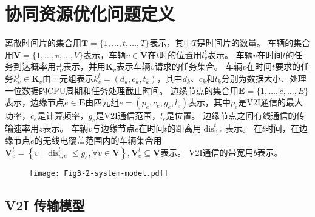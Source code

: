 \section{协同资源优化问题定义}\label{section 3-3}

离散时间片的集合用$\mathbf{T}=\{1, \ldots, t, \ldots, T\}$表示，其中$T$是时间片的数量。
车辆的集合用$\mathbf{V}=\{1, \ldots, v, \ldots, V\}$表示，车辆$v \in \mathbf{V}$在$t$时的位置用$l_{v}^{t}$表示。
车辆$v$在时间$t$的任务到达概率用$\tau_{v}^{t}$表示，并用$\mathbf{K}_{v}$表示车辆$v$请求的任务集合。
车辆$v$在时间$t$要求的任务$k_{v}^{t} \in \mathbf{K}_{v}$由三元组表示$k_{v}^{t}=\left(d_{k}, c_{k}, t_{k}\right)$，其中$d_{k}$、$c_{k}$和$t_{k}$分别为数据大小、处理一位数据的CPU周期和任务处理截止时间。
边缘节点的集合用$\mathbf{E}=\{1, \ldots, e, \ldots, E\}$表示，边缘节点$e \in \mathbf{E}$由四元组$e=\left(p_{e}, c_{e}, g_{e}, l_{e}\right)$表示，其中$p_{e}$是V2I通信的最大功率，$c_{e}$是计算频率，$g_e$是V2I通信范围，$l_{e}$是位置。
边缘节点之间有线通信的传输速率用$z$表示。
车辆$v$与边缘节点$e$在时间$t$的距离用$\operatorname{dis}_{v, e}^{t}$表示。
在$t$时间，在边缘节点$e$的无线电覆盖范围内的车辆集合用$\mathbf{V}_{e}^{t}=\left\{v \mid \operatorname{dis}_{v, e}^{t} \leq g_{e}, \forall v \in \mathbf{V}\right\}, \mathbf{V}_{e}^{t} \subseteq \mathbf{V}$表示。
V2I通信的带宽用$b$表示。

\begin{figure}[h]
\centering
  \texttt{[image: Fig3-2-system-model.pdf]}
  \label{fig 3-2}
\end{figure}

\subsection{V2I 传输模型}

